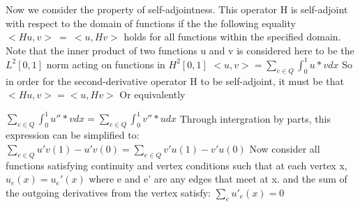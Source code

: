 \documentclass[12pt]{article}
\begin{document}
\centerline{}

Now we consider the property of self-adjointness. This operator H is self-adjoint with respect to the domain of functions if the the following equality $<Hu, v> \ = \ <u, Hv>$ holds for all functions within the specified domain. Note that the inner product of two functions u and v is considered here to be the $L^2[0, 1]$ norm acting on functions in $H^2[0, 1]$
\newline
\newline
$<u, v> = \sum\nolimits_{e \in Q} \int_{0}^{1}u*vdx$
\newline
\newline
So in order for the second-derivative operator H to be self-adjoint, it must be that
\newline
$<Hu, v> = <u, Hv> $
\newline
\newline
Or equivalently
\newline
\newline

$\sum\nolimits_{e \in Q} \int_{0}^{1}u''*vdx= \sum\nolimits_{e \in Q} \int_{0}^{1}v''*udx$
\newline
\newline
Through intergration by parts, this expression can be simplified to:
\newline
\newline
$\sum\nolimits_{e \in Q}u'v(1)-u'v(0)= \sum\nolimits_{e \in Q} v'u(1) - v'u(0) $
\newline
\newline
Now consider all functions satisfying continuity and vertex conditions such that at each vertex x, $u_e(x) = u_e'(x)$ where e and e' are any edges that meet at x. 
and the sum of the outgoing derivatives from the vertex satisfy: 
$\sum\nolimits_{e} u'_e (x) = 0$
\end{document}
